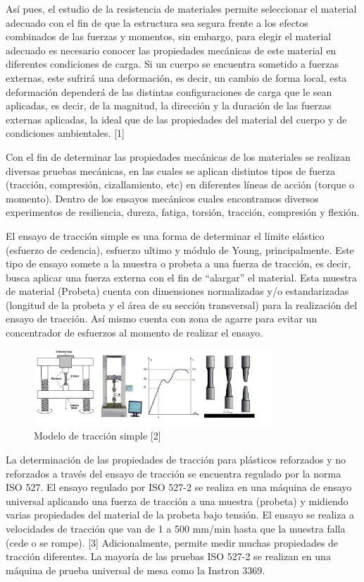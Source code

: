 \documentclass[journal,transmag]{IEEEtran}
\begin{document}
Así pues, el estudio de la resistencia de materiales permite seleccionar el material adecuado con el fin de que la estructura sea segura frente a los efectos combinados de las fuerzas y momentos, sin embargo, para elegir el material adecuado es necesario conocer las propiedades mecánicas de este material en diferentes condiciones de carga. Si un cuerpo se encuentra sometido a fuerzas externas, este sufrirá una deformación, es decir, un cambio de forma local, esta deformación dependerá de las distintas configuraciones de carga que le sean aplicadas, es decir, de la magnitud, la dirección y la duración de las fuerzas externas aplicadas, la ideal que de las propiedades del material del cuerpo y de condiciones ambientales. [1] 

Con el fin de determinar las propiedades mecánicas de los materiales se realizan diversas pruebas mecánicas, en las cuales se aplican distintos tipos de fuerza (tracción, compresión, cizallamiento, etc) en diferentes líneas de acción (torque o momento). Dentro de los ensayos mecánicos cuales encontramos diversos experimentos de resiliencia, dureza, fatiga, torsión, tracción, compresión y flexión.  

El ensayo de tracción simple es una forma de determinar el límite elástico (esfuerzo de cedencia), esfuerzo ultimo y módulo de Young, principalmente. Este tipo de ensayo somete a la muestra o probeta a una fuerza de tracción, es decir, busca aplicar una fuerza externa con el fin de “alargar” el material. Esta muestra de material (Probeta) cuenta con dimensiones normalizadas y/o estandarizadas (longitud de la probeta y el área de su sección transversal) para la realización del ensayo de tracción. Así mismo cuenta con zona de agarre para evitar un concentrador de esfuerzos al momento de realizar el ensayo. 


	\begin{figure}[!h]
		\center
		\includegraphics[width=9cm]{imagenes/primera.png}
		\caption{Modelo de tracción simple [2]}
		\label{1}
	\end{figure}
	
	La determinación de las propiedades de tracción para plásticos reforzados y no reforzados a través del ensayo de tracción se encuentra regulado por la norma ISO 527. El ensayo regulado por ISO 527-2 se realiza en una máquina de ensayo universal aplicando una fuerza de tracción a una muestra (probeta) y midiendo varias propiedades del material de la probeta bajo tensión. El ensayo se realiza a velocidades de tracción que van de 1 a 500 mm/min hasta que la muestra falla (cede o se rompe). [3] Adicionalmente, permite medir muchas propiedades de tracción diferentes. La mayoría de las pruebas ISO 527-2 se realizan en una máquina de prueba universal de mesa como la Instron 3369. 
	
\end{document}
